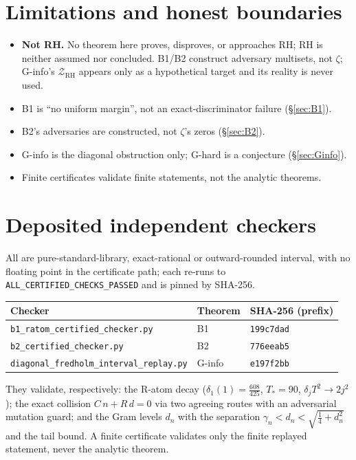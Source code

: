 \documentclass[11pt]{article}
\theoremstyle{plain}
\theoremstyle{definition}
\theoremstyle{remark}
\begin{document}
\section{Limitations and honest boundaries}\label{sec:limits}
\begin{itemize}
  \item \textbf{Not RH.} No theorem here proves, disproves, or approaches RH; RH is neither
  assumed nor concluded. B1/B2 construct adversary multisets, not $\zeta$; G-info's
  $\mathcal Z_{\mathrm{RH}}$ appears only as a hypothetical target and its reality is never
  used.
  \item B1 is ``no uniform margin'', not an exact-discriminator failure (\S\ref{sec:B1}).
  \item B2's adversaries are constructed, not $\zeta$'s zeros (\S\ref{sec:B2}).
  \item G-info is the diagonal obstruction only; G-hard is a conjecture (\S\ref{sec:Ginfo}).
  \item Finite certificates validate finite statements, not the analytic theorems.
\end{itemize}

\appendix
\section{Deposited independent checkers}\label{app:checkers}
All are pure-standard-library, exact-rational or outward-rounded interval, with no floating
point in the certificate path; each re-runs to \texttt{ALL\_CERTIFIED\_CHECKS\_PASSED} and is
pinned by SHA-256.

\begin{center}
\begin{tabular}{lll}
\hline
Checker & Theorem & SHA-256 (prefix) \\
\hline
\texttt{b1\_ratom\_certified\_checker.py} & B1 & \texttt{199c7dad}\\
\texttt{b2\_certified\_checker.py} & B2 & \texttt{776eeab5}\\
\texttt{diagonal\_fredholm\_interval\_replay.py} & G-info & \texttt{e197f2bb}\\
\hline
\end{tabular}
\end{center}
\noindent They validate, respectively: the R-atom decay
($\delta_1(1)=\tfrac{608}{425}$, $T_*=90$, $\delta_jT^2\to 2j^2$); the exact collision
$C\,n+R\,d=0$ via two agreeing routes with an adversarial mutation guard; and the Gram levels
$d_n$ with the separation $\gamma_n<d_n<\sqrt{\tfrac14+d_n^2}$ and the tail bound. A finite
certificate validates only the finite replayed statement, never the analytic theorem.
\end{document}
